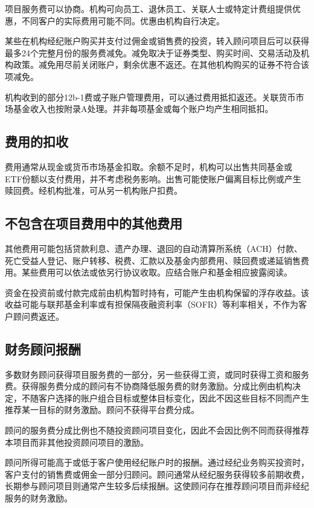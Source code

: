\documentclass[UTF8,fontset=none,11pt,a4paper]{ctexart}
\begin{document}
项目服务费可以协商。机构可向员工、退休员工、关联人士或特定计费组提供优惠，不同客户的实际费用可能不同。优惠由机构\allowbreak\mbox{自行决定。}


某些在机构经纪账户购买并支付过佣金或销售费的投资，转入顾问项目后可以获得最多24个完整月份的服务费减免。减免取决于证券类型、购买时间、交易活动及机构政策。减免用尽前关闭账户，剩余优惠不返还。在其他机构购买的证券不符合\allowbreak\mbox{该项减免。}


机构收到的部分12b-1费或子账户管理费用，可以通过费用抵扣返还。关联货币市场基金收入也按附录A处理。并非每项基金或每个账户均产生\allowbreak\mbox{相同抵扣。}


\subsection*{费用的扣收}
费用通常从现金或货币市场基金扣取。余额不足时，机构可以出售共同基金或ETF份额以支付费用，并不考虑税务影响。出售可能使账户偏离目标比例或产生赎回费。经机构批准，可从另一机构\allowbreak\mbox{账户扣费。}


\subsection*{不包含在项目费用中的其他费用}
其他费用可能包括贷款利息、遗产办理、退回的自动清算所系统（ACH）付款、死亡受益人登记、账户转移、税费、汇款以及基金内部费用、赎回费或递延销售费用。某些费用可以依法或依另行协议收取。应结合账户和基金相应披\allowbreak\mbox{露阅读。}


资金在投资前或付款完成前由机构暂时持有，可能产生由机构保留的浮存收益。该收益可能与联邦基金利率或有担保隔夜融资利率（SOFR）等利率相关，不作为客户顾问\allowbreak\mbox{费返还。}


\subsection*{财务顾问报酬}
多数财务顾问获得项目服务费的一部分，另一些获得工资，或同时获得工资和服务费。获得服务费分成的顾问有不协商降低服务费的财务激励。分成比例由机构决定，不随客户选择的账户组合目标或整体目标变化，因此不因这些目标不同而产生推荐某一目标的财务激励。顾问不获得平\allowbreak\mbox{台费分成。}


顾问的服务费分成比例也不随投资顾问项目变化，因此不会因比例不同而获得推荐本项目而非其他投资顾问项\allowbreak\mbox{目的激励。}


顾问所得可能高于或低于客户使用经纪账户时的报酬。通过经纪业务购买投资时，客户支付的销售费或佣金一部分归顾问。顾问通常从经纪服务获得较多前期收费，长期参与顾问项目则通常产生较多后续报酬。这使顾问存在推荐顾问项目而非经纪服务的\allowbreak\mbox{财务激励。}
\end{document}
